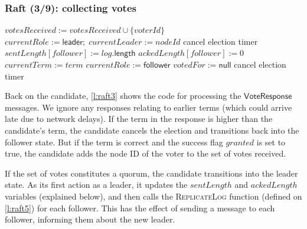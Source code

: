\begin{frame}
    \label{s:raft3}
    \frametitle{Raft (3/9): collecting votes}
    \footnotesize
    \begin{algorithmic}
        \State
                \State $\mathit{votesReceived} := \mathit{votesReceived} \cup \{\mathit{voterId}\}$
                    \State $\mathit{currentRole} := \mathsf{leader};\; \mathit{currentLeader} := \mathit{nodeId}$
                    \State cancel election timer
                        \State $\mathit{sentLength}[\mathit{follower}] := \mathit{log}.\mathsf{length}$
                        \State $\mathit{ackedLength}[\mathit{follower}] := 0$
                        \State {}
                    \EndFor
                \EndIf
                \State $\mathit{currentTerm} := \mathit{term}$
                \State $\mathit{currentRole} := \mathsf{follower}$
                \State $\mathit{votedFor} := \mathsf{null}$
                \State cancel election timer
            \EndIf
        \EndOn
        \State
    \end{algorithmic}
\end{frame}
\label{l:raft3}

Back on the candidate, \autoref{l:raft3} shows the code for processing the $\mathsf{VoteResponse}$ messages.
We ignore any responses relating to earlier terms (which could arrive late due to network delays).
If the term in the response is higher than the candidate's term, the candidate cancels the election and transitions back into the follower state.
But if the term is correct and the success flag $\mathit{granted}$ is set to true, the candidate adds the node ID of the voter to the set of votes received.

If the set of votes constitutes a quorum, the candidate transitions into the leader state.
As its first action as a leader, it updates the $\mathit{sentLength}$ and $\mathit{ackedLength}$ variables (explained below), and then calls the \textsc{ReplicateLog} function (defined on \autoref{l:raft5}) for each follower.
This has the effect of sending a message to each follower, informing them about the new leader.

